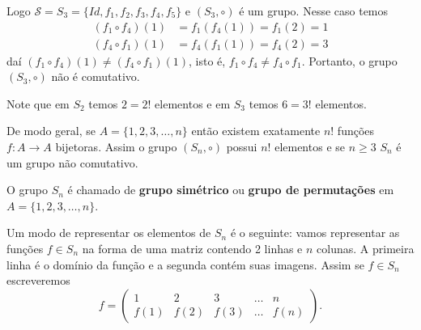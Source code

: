 Logo $\mathcal{S} = S_3 = \{Id, f_1, f_2, f_3, f_4, f_5\}$ e $(S_3, \circ)$ é um grupo. Nesse caso temos
\begin{align*}
    (f_1 \circ f_4)(1) &= f_1(f_4(1)) = f_1(2) = 1\\
    (f_4 \circ f_1)(1) &= f_4(f_1(1)) = f_4(2) = 3
\end{align*}
daí $(f_1 \circ f_4)(1) \ne (f_4 \circ f_1)(1)$, isto é, $f_1 \circ f_4 \ne f_4 \circ f_1$. Portanto, o grupo $(S_3, \circ)$ não é comutativo.

Note que em $S_2$ temos $2 = 2!$ elementos e em $S_3$ temos $6 = 3!$ elementos.

De modo geral, se $A = \{1, 2, 3, \dots, n\}$ então existem exatamente $n!$ funções $f : A \to A$ bijetoras. Assim o grupo $(S_n, \circ)$ possui $n!$ elementos e se $n \geqslant 3$ $S_n$ é um grupo não comutativo.

\begin{definicao}
    O grupo $S_n$ é chamado de \textbf{grupo simétrico} ou \textbf{grupo de permutações} em $A = \{1, 2, 3, \dots, n\}$.
\end{definicao}


Um modo de representar os elementos de $S_n$ é o seguinte: vamos representar as funções $f \in S_n$ na forma de uma matriz contendo 2 linhas e $n$ colunas. A primeira linha é o domínio da função e a segunda contém suas imagens. Assim se $f \in S_n$ escreveremos
\[
    f = \begin{pmatrix}
        1 & 2 & 3 & \dots & n\\
        f(1) & f(2) & f(3) & \dots & f(n)
    \end{pmatrix}.
\]

